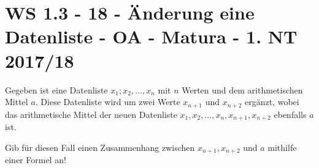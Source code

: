 \section{WS 1.3 - 18 - Änderung eine Datenliste - OA - Matura - 1. NT 2017/18}

\begin{beispiel}[WS 1.3]{1}
Gegeben ist eine Datenliste $x_1; x_2, ..., x_n$ mit $n$ Werten und dem arithmetischen Mittel $a$. Diese Datenliste wird um zwei Werte $x_{n+1}$ und $x_{n+2}$ ergänzt, wobei das arithmetische Mittel der neuen Datenliste $x_1, x_2, ..., x_n, x_{n+1}, x_{n+2}$ ebenfalls $a$ ist.

Gib für diesen Fall einen Zusammenhang zwischen $x_{n+1}, x_{n+2}$ und $a$ mithilfe einer Formel an!

\end{beispiel}